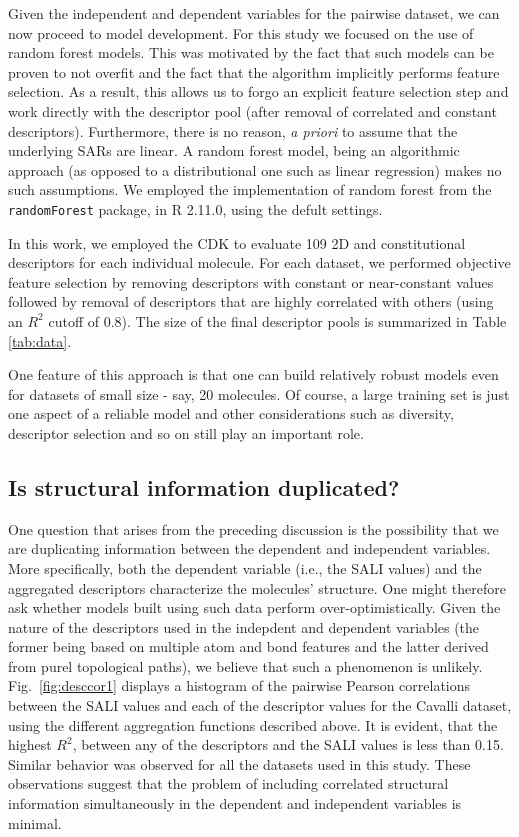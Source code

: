 \documentclass[letterpaper, 12pt]{article}
\begin{document}
Given the independent and dependent variables for the pairwise
dataset, we can now proceed to model development. For this study we
focused on the use of random forest models\cite{Breiman:1984aa}. This
was motivated by the fact that such models can be proven to not
overfit and the fact that the algorithm implicitly performs feature
selection. As a result, this allows us to forgo an explicit feature
selection step and work directly with the descriptor pool (after
removal of correlated and constant descriptors). Furthermore, there is
no reason, \emph{a priori} to assume that the underlying SARs are
linear. A random forest model, being an algorithmic
approach\cite{Breiman:2001nx} (as opposed to a distributional one such
as linear regression) makes no such assumptions. We employed the  
implementation of random forest from the \texttt{randomForest}
package, in R 2.11.0\cite{r}, using the defult settings.

In this work, we employed the CDK to evaluate 109 2D and
constitutional descriptors for each individual molecule. For each
dataset, we performed objective feature selection by removing
descriptors with constant or near-constant values followed by removal
of descriptors that are highly correlated with others (using an $R^2$
cutoff of 0.8). The size of the final descriptor pools is summarized
in Table \ref{tab:data}.

One feature of this approach is that one can build relatively robust
models even for datasets of small size - say, 20 molecules. Of course,
a large training set is just one aspect of a reliable model and other
considerations such as diversity, descriptor selection and so on still
play an important role.

\subsection{Is structural information duplicated?}
\label{sec:are-we-duplicating}

One question that arises from the preceding discussion is the
possibility that we are duplicating information between the dependent
and independent variables. More specifically, both the dependent
variable (i.e., the SALI values) and the aggregated descriptors
characterize the molecules' structure. One might therefore ask whether
models built using such data perform over-optimistically. Given the
nature of the descriptors used in the indepdent and dependent
variables (the former being based on multiple atom and bond features
and the latter derived from purel topological paths), we believe that such a
phenomenon is unlikely.  Fig.~\ref{fig:desccor1} displays a histogram
of the pairwise Pearson correlations between the SALI values and each
of the descriptor values for the Cavalli\cite{Cavalli:2002aa} dataset,
using the different aggregation functions described above. It is
evident, that the highest $R^2$, between any of the descriptors and
the SALI values is less than 0.15. Similar behavior was observed for
all the datasets used in this study. These observations
suggest that the problem of including correlated structural
information simultaneously in the dependent and independent variables
is minimal.
\end{document}
